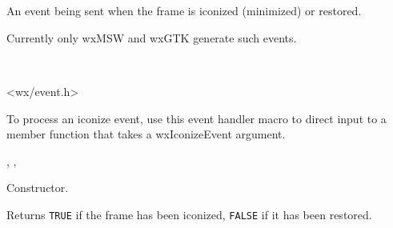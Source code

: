 
\section{}\label{wxiconizeevent}

An event being sent when the frame is iconized (minimized) or restored.

Currently only wxMSW and wxGTK generate such events.


\\


<wx/event.h>


To process an iconize event, use this event handler macro to direct input to a
member function that takes a wxIconizeEvent argument.

\twocolwidtha{7cm}
\begin{twocollist}\itemsep=0pt
\end{twocollist}%


,\rtfsp
{},\rtfsp
{}


\label{wxiconizeeventctor}


Constructor.

\label{wxiconizeeventiconized}


Returns {\tt TRUE} if the frame has been iconized, {\tt FALSE} if it has been
restored.

